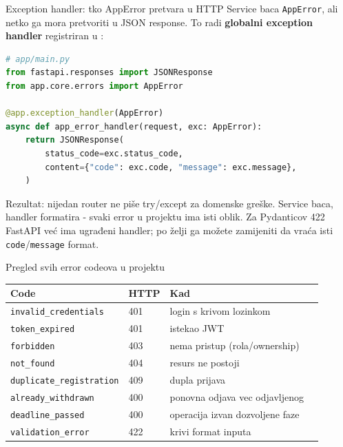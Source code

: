 \begin{frame}[fragile,shrink=5]{Exception handler: tko AppError pretvara u HTTP}
Service baca \texttt{AppError}, ali netko ga mora pretvoriti u JSON response. To radi \textbf{globalni exception handler} registriran u :

\begin{lstlisting}[language=python]
# app/main.py
from fastapi.responses import JSONResponse
from app.core.errors import AppError

@app.exception_handler(AppError)
async def app_error_handler(request, exc: AppError):
    return JSONResponse(
        status_code=exc.status_code,
        content={"code": exc.code, "message": exc.message},
    )
\end{lstlisting}

\vspace{0.4em}
Rezultat: nijedan router ne piše try/except za domenske greške. Service baca, handler formatira - svaki error u projektu ima isti oblik. Za Pydanticov 422 FastAPI već ima ugrađeni handler; po želji ga možete zamijeniti da vraća isti \texttt{code}/\texttt{message} format.
\end{frame}

\begin{frame}{Pregled svih error codeova u projektu}
\begin{tabular}{@{}llll@{}}
  \toprule
  \textbf{Code} & \textbf{HTTP} & \textbf{Kad} \\
  \midrule
  \texttt{invalid\_credentials} & 401 & login s krivom lozinkom \\
  \texttt{token\_expired} & 401 & istekao JWT \\
  \texttt{forbidden} & 403 & nema pristup (rola/ownership) \\
  \texttt{not\_found} & 404 & resurs ne postoji \\
  \texttt{duplicate\_registration} & 409 & dupla prijava \\
  \texttt{already\_withdrawn} & 400 & ponovna odjava vec odjavljenog \\
  \texttt{deadline\_passed} & 400 & operacija izvan dozvoljene faze \\
  \texttt{validation\_error} & 422 & krivi format inputa \\
  \bottomrule
\end{tabular}
\end{frame}


